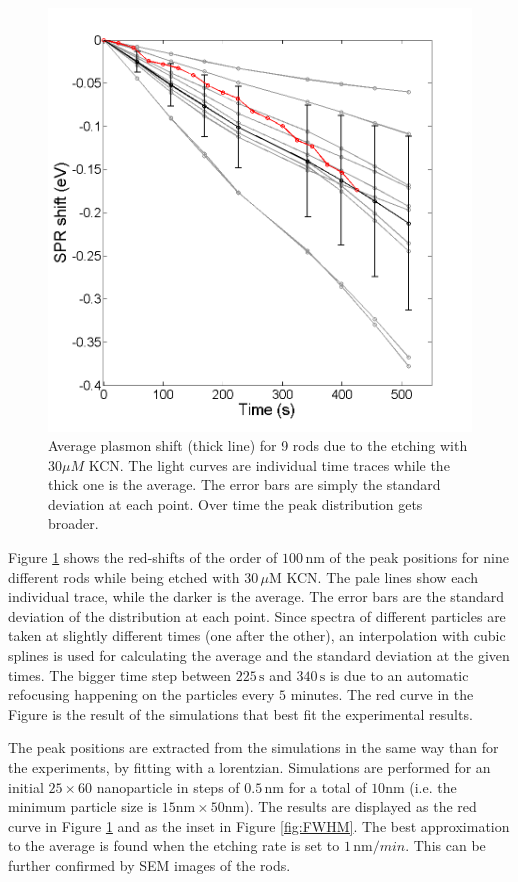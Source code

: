 \documentclass{article}
\begin{document}
\begin{figure}[p]
 \centering
 \includegraphics[width=0.95\linewidth]{plasmon_average.png}
 \caption{Average plasmon shift (thick line) for 9 rods due to the etching with
 $30\mu M$ KCN. The light curves are individual time traces while the thick one
 is the average. The error bars are simply the standard deviation at each point. Over
 time the peak distribution gets broader.}
 \label{fig:plasmon_average}
\end{figure}

Figure \ref{fig:plasmon_average} shows the red-shifts of the order of
$100\,\textrm{nm}$ of the peak positions for nine different rods while being
etched with $30\,\mu\textrm{M}$ KCN. The pale lines show each individual trace,
while the darker is the average. The error bars are the standard deviation of
the distribution at each point. Since spectra of different particles are taken
at slightly different times (one after the other), an interpolation with cubic
splines is used for calculating the average and the standard deviation at the
given times. The bigger time step between $225\,\textrm{s}$ and
$340\,\textrm{s}$ is due to an automatic refocusing happening on the particles
every $5$ minutes. The red curve in the Figure is the result of the simulations
that best fit the experimental results.

The peak positions are extracted from the simulations in the same way
than for the experiments, by fitting with a lorentzian. Simulations are
performed for an initial $25\times60$ nanoparticle in steps of
$0.5\,\textrm{nm}$ for a total of $10\textrm{nm}$ (i.e. the minimum particle
size is $15\textrm{nm}\times 50 \textrm{nm}$). The results are displayed as the
red curve in Figure \ref{fig:plasmon_average} and as the inset in Figure
\ref{fig:FWHM}. The best approximation to the average is found when the etching
rate is set to $1\,\textrm{nm}/min$. This can be further confirmed by SEM images
of the rods. 
\end{document}
